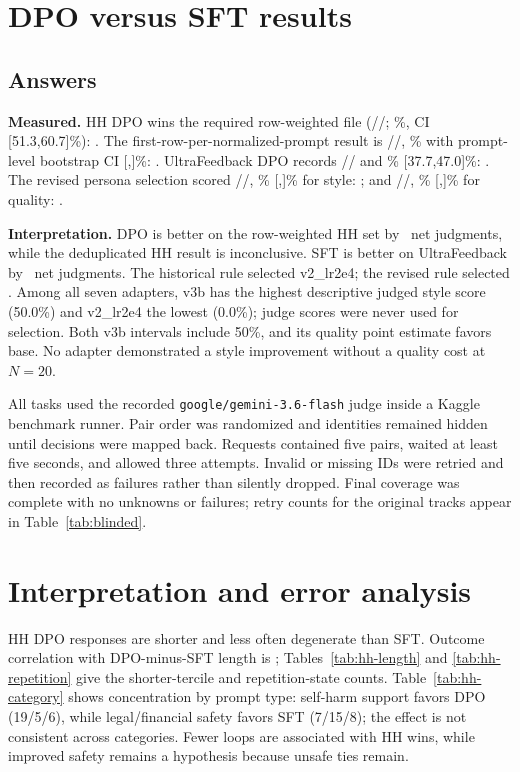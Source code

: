 \documentclass[10pt,a4paper]{article}
\begin{document}
\section{DPO versus SFT results}

\subsection{Answers}
\textbf{Measured.} HH DPO wins the required row-weighted file (\HHW/\HHL/\HHT; \HHScore\%, CI [51.3,60.7]\%): \HHRowsVerdict. The first-row-per-normalized-prompt result is \HHUniqueW/\HHUniqueL/\HHUniqueT, \HHUniqueScore\% with prompt-level bootstrap CI [\HHUniqueCILo,\HHUniqueCIHi]\%: \HHUniqueVerdict. UltraFeedback DPO records \UFW/\UFL/\UFT{} and \UFScore\% [37.7,47.0]\%: \UFVerdict. The revised persona selection \PersonaSelected scored \PersonaStyleW/\PersonaStyleL/\PersonaStyleT, \PersonaStyleScore\% [\PersonaStyleCILo,\PersonaStyleCIHi]\% for style: \PersonaStyleVerdict; and \PersonaQualityW/\PersonaQualityL/\PersonaQualityT, \PersonaQualityScore\% [\PersonaQualityCILo,\PersonaQualityCIHi]\% for quality: \PersonaQualityVerdict.

\textbf{Interpretation.} DPO is better on the row-weighted HH set by \HHNetWins\ net judgments, while the deduplicated HH result is inconclusive. SFT is better on UltraFeedback by \UFNetLosses\ net judgments. The historical rule selected v2\_lr2e4; the revised rule selected \PersonaSelected. Among all seven adapters, v3b has the highest descriptive judged style score (50.0\%) and v2\_lr2e4 the lowest (0.0\%); judge scores were never used for selection. Both v3b intervals include 50\%, and its quality point estimate favors base. No adapter demonstrated a style improvement without a quality cost at $N=20$.

All tasks used the recorded \texttt{google/gemini-3.6-flash} judge inside a Kaggle benchmark runner. Pair order was randomized and identities remained hidden until decisions were mapped back. Requests contained five pairs, waited at least five seconds, and allowed three attempts. Invalid or missing IDs were retried and then recorded as failures rather than silently dropped. Final coverage was complete with no unknowns or failures; retry counts for the original tracks appear in Table~\ref{tab:blinded}.

\section{Interpretation and error analysis}
HH DPO responses are shorter and less often degenerate than SFT. Outcome correlation with DPO-minus-SFT length is \HHRho; Tables~\ref{tab:hh-length} and \ref{tab:hh-repetition} give the shorter-tercile and repetition-state counts. Table~\ref{tab:hh-category} shows concentration by prompt type: self-harm support favors DPO (19/5/6), while legal/financial safety favors SFT (7/15/8); the effect is not consistent across categories. Fewer loops are associated with HH wins, while improved safety remains a hypothesis because unsafe ties remain.
\end{document}
